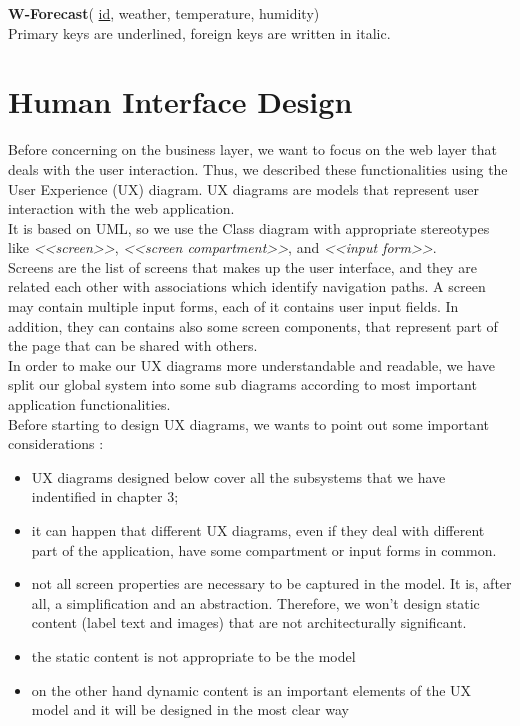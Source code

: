 \documentclass[12pt]{book}
\begin{document}
\textbf{W-Forecast}( \underline{id}, weather, temperature, humidity)\\

Primary keys are underlined, foreign keys are written in italic.

\chapter{Human Interface Design}
Before concerning on the business layer, we want to focus on the web layer that deals with the user interaction.  
Thus, we described these functionalities using the User Experience (UX) diagram. UX diagrams are models that represent user interaction with the web application.\\
It is based on UML, so we use the Class diagram with appropriate stereotypes like \textit{<<screen>>}, \textit{<<screen compartment>>}, and \textit{<<input form>>}. \\
Screens are the list of screens that makes up the user interface, and they are related each other with associations which identify navigation paths. 
A screen may contain multiple input forms, each of it contains user input fields. In addition, they can contains also some screen components, that represent part of the page that can be shared with others. \\

In order to make our UX diagrams more understandable and readable, we have split our global system into some sub diagrams according to most important application functionalities. \\
Before starting to design UX diagrams, we wants to point out some important considerations : \\
\begin{itemize}
\item {UX diagrams designed below cover all the subsystems that we have indentified in chapter 3; }
\item{ it can happen that different UX diagrams, even if they deal with different part of the application, have some compartment or input forms in common.} 
\item {not all screen properties are necessary to be captured in the model. It is, after all, a simplification and an abstraction. Therefore, we won't design static content (label text and images) that are not architecturally significant. }
\item{ the static content is not appropriate to be the model}
\item {on the other hand dynamic content is an important elements of the UX model and it will be designed in the most clear way }
\end{itemize}
\end{document}
